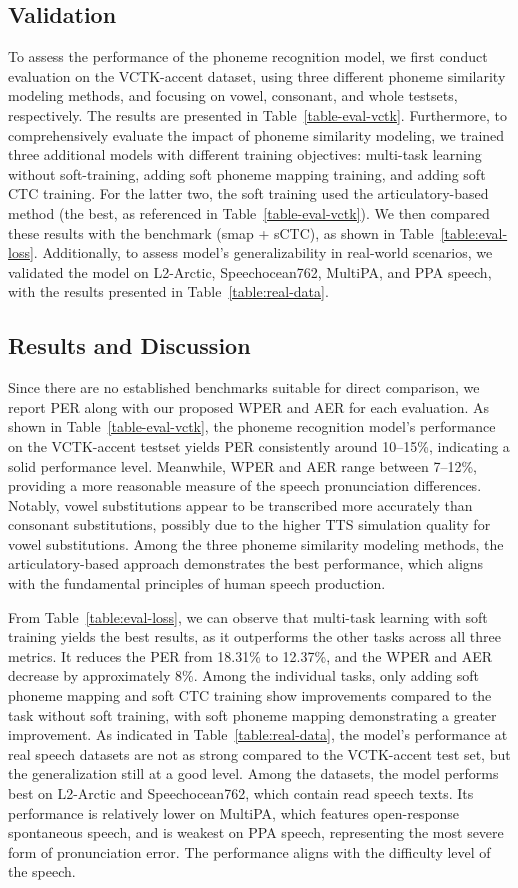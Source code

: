\subsection{Validation}
To assess the performance of the phoneme recognition model, we first conduct evaluation on the VCTK-accent dataset, using three different phoneme similarity modeling methods, and focusing on vowel, consonant, and whole testsets, respectively. The results are presented in Table~\ref{table-eval-vctk}. 
Furthermore, to comprehensively evaluate the impact of phoneme similarity modeling, we trained three additional models with different training objectives: multi-task learning without soft-training, adding soft phoneme mapping training, and adding soft CTC training. For the latter two, the soft training used the articulatory-based method (the best, as referenced in Table~\ref{table-eval-vctk}). We then compared these results with the benchmark (smap + sCTC), as shown in Table~\ref{table:eval-loss}. Additionally, to assess model's generalizability in real-world scenarios, we validated the model on L2-Arctic, Speechocean762, MultiPA, and PPA speech, with the results presented in Table~\ref{table:real-data}.




\subsection{Results and Discussion}
Since there are no established benchmarks suitable for direct comparison, we report PER along with our proposed WPER and AER for each evaluation. As shown in Table~\ref{table-eval-vctk}, the phoneme recognition model's performance on the VCTK-accent testset yields PER consistently around 10–15\%, indicating a solid performance level. Meanwhile, WPER and AER range between 7–12\%, providing a more reasonable measure of the speech pronunciation differences. Notably, vowel substitutions appear to be transcribed more accurately than consonant substitutions, possibly due to the higher TTS simulation quality for vowel substitutions. Among the three phoneme similarity modeling methods, the articulatory-based approach demonstrates the best performance, which aligns with the fundamental principles of human speech production.

From Table~\ref{table:eval-loss}, we can observe that multi-task learning with soft training yields the best results, as it outperforms the other tasks across all three metrics. It reduces the PER from 18.31\% to 12.37\%, and the WPER and AER decrease by approximately 8\%. Among the individual tasks, only adding soft phoneme mapping and soft CTC training show improvements compared to the task without soft training, with soft phoneme mapping demonstrating a greater improvement.
As indicated in Table~\ref{table:real-data}, the model's performance at real speech datasets are not as strong compared to the VCTK-accent test set, but the generalization still at a good level. Among the datasets, the model performs best on L2-Arctic and Speechocean762, which contain read speech texts. Its performance is relatively lower on MultiPA, which features open-response spontaneous speech, and is weakest on PPA speech, representing the most severe form of pronunciation error. 
The performance aligns with the difficulty level of the speech.